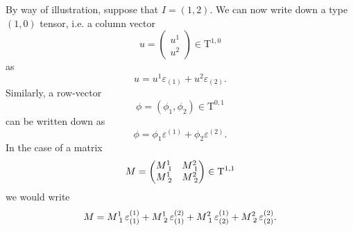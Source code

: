 \documentclass[12pt]{article}
\newcommand{\rT}{\mathrm{T}}
\newcommand{\tspace}[1]{\rT^{#1}}
\newcommand{\ca}{\varepsilon}
\newcommand{\ud}[2]{^{#1}_{\!\hphantom{#1}#2}}
\begin{document}
By way of illustration, suppose that $I=(1,2)$.  We can now write down
a type $(1,0)$ tensor, i.e. a column vector
$$u=
\begin{pmatrix}
  u^1 \\ u^2
\end{pmatrix}\in \tspace{1,0}
$$
as
$$u = u^1 \ca_{(1)} + u^2 \ca_{(2)}.$$
Similarly, a row-vector
$$\phi = (\phi_1,\phi_2) \in \tspace{0,1}$$
can be written down as
$$\phi = \phi_1 \ca^{(1)} + \phi_2 \ca^{(2)}.$$
In the case of a matrix
$$
M = 
\begin{pmatrix}
  M\ud{1}{1} & M\ud{2}{1} \\
  M\ud{1}{2} & M\ud{2}{2}
\end{pmatrix}\in \tspace{1,1}
$$
we would write
$$ M = 
M\ud{1}{1}\, \ca^{(1)}_{(1)}+
M\ud{1}{2}\, \ca^{(2)}_{(1)}+
M\ud{2}{1}\, \ca^{(1)}_{(2)}+
M\ud{2}{2}\, \ca^{(2)}_{(2)}.
$$
\end{document}
